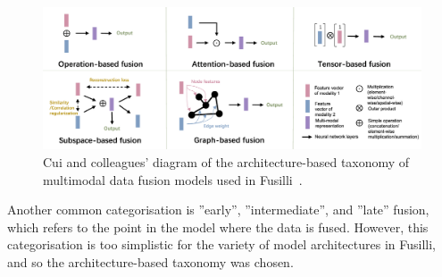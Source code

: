 
\begin{figure}
    \centering
    \includegraphics[width=\textwidth]{figures/cui_diagram}
    \caption[Diagrams of the categories of the multimodal fusion models in Fusilli.]{Cui and colleagues' diagram of the architecture-based taxonomy of multimodal data fusion models used in Fusilli~\cite{cuiDeepMultimodalFusion2022}.}
    \label{fig:fusilli_taxonomy}
\end{figure}


Another common categorisation is ''early'', ''intermediate'', and ''late'' fusion, which refers to the point in the model where the data is fused.
However, this categorisation is too simplistic for the variety of model architectures in Fusilli, and so the architecture-based taxonomy was chosen.

